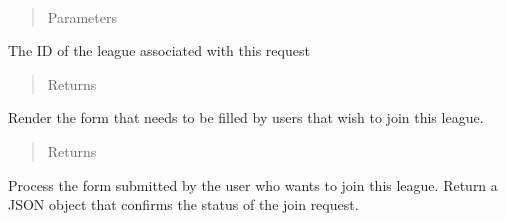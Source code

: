 \documentclass[letterpaper,10pt,english]{sphinxmanual}
\begin{document}
\begin{fulllineitems}
\label{\detokenize{tiger_leagues/readme:tiger_leagues.league.join_league}}~\begin{quote}\begin{description}
\item[{Parameters}] \leavevmode
{} \textendash{} 

\end{description}\end{quote}

The ID of the league associated with this request
\begin{quote}\begin{description}
\item[{Returns}] \leavevmode
{}

\end{description}\end{quote}

Render the form that needs to be filled by users that wish to join 
this league.
\begin{quote}\begin{description}
\item[{Returns}] \leavevmode
{}

\end{description}\end{quote}

Process the form submitted by the user who wants to join this league. Return 
a JSON object that confirms the status of the join request.

\end{fulllineitems}

\end{document}
